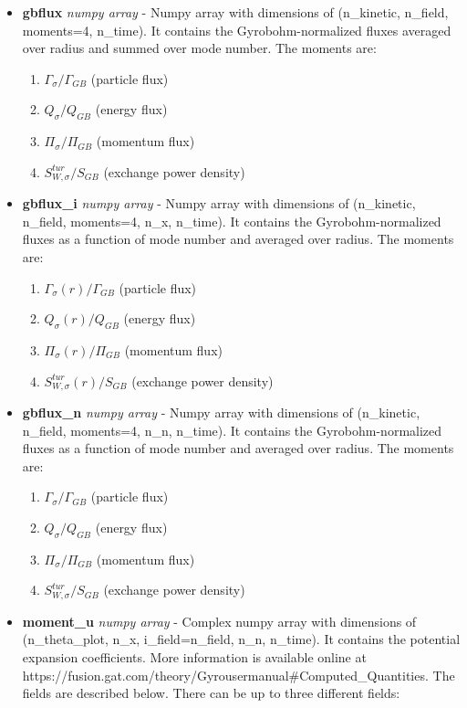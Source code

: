 \documentclass{article}
\begin{document}
\begin{itemize}
\begin{itemize}
\begin{enumerate}
\end{enumerate}
\item \textbf{gbflux}\emph{ numpy array} - Numpy array with dimensions of (n\_kinetic, n\_field, moments=4, n\_time).  It contains the Gyrobohm-normalized fluxes averaged over radius and summed over mode number.  The moments are:
\begin{enumerate}
\item $\Gamma_\sigma/\Gamma_{GB}$ (particle flux)
\item $Q_\sigma/Q_{GB}$ (energy flux)
\item $\Pi_\sigma/\Pi_{GB}$ (momentum flux)
\item $S^{tur}_{W,\sigma}/S_{GB}$ (exchange power density)
\end{enumerate}
\item \textbf{gbflux\_i}\emph{ numpy array} - Numpy array with dimensions of (n\_kinetic, n\_field, moments=4, n\_x, n\_time).  It contains the Gyrobohm-normalized fluxes as a function of mode number and averaged over radius.  The moments are:
\begin{enumerate}
\item $\Gamma_\sigma(r)/\Gamma_{GB}$ (particle flux)
\item $Q_\sigma(r)/Q_{GB}$ (energy flux)
\item $\Pi_\sigma(r)/\Pi_{GB}$ (momentum flux)
\item $S^{tur}_{W,\sigma}(r)/S_{GB}$ (exchange power density)
\end{enumerate}
\item \textbf{gbflux\_n}\emph{ numpy array} - Numpy array with dimensions of (n\_kinetic, n\_field, moments=4, n\_n, n\_time).  It contains the Gyrobohm-normalized fluxes as a function of mode number and averaged over radius.  The moments are:
\begin{enumerate}
\item $\Gamma_\sigma/\Gamma_{GB}$ (particle flux)
\item $Q_\sigma/Q_{GB}$ (energy flux)
\item $\Pi_\sigma/\Pi_{GB}$ (momentum flux)
\item $S^{tur}_{W,\sigma}/S_{GB}$ (exchange power density)
\end{enumerate}
\item \textbf{moment\_u}\emph{ numpy array} - Complex numpy array with dimensions of (n\_theta\_plot, n\_x, i\_field=n\_field, n\_n, n\_time).  It contains the potential expansion coefficients.  More information is available online at https://fusion.gat.com/theory/Gyrousermanual\#Computed\_Quantities.  The fields are described below.  There can be up to three different fields:

\end{itemize}
\end{itemize}
\end{document}

